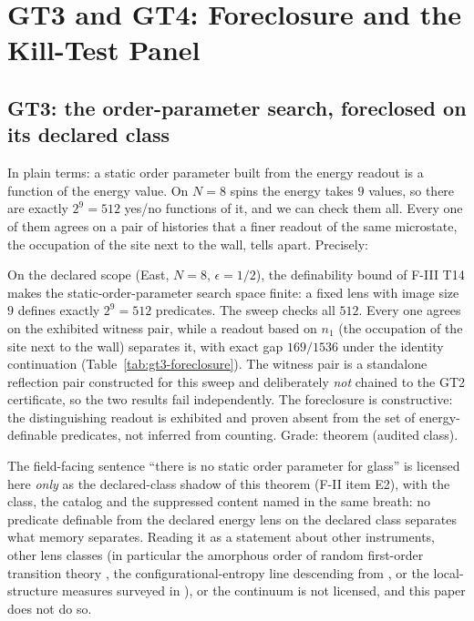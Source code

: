\section{GT3 and GT4: Foreclosure and the Kill-Test Panel}
\label{sec:gt3-gt4}

\subsection{GT3: the order-parameter search, foreclosed on its declared class}

In plain terms: a static order parameter built from the energy readout is a function of the energy
value. On $N=8$ spins the energy takes $9$ values, so there are exactly $2^9 = 512$ yes/no
functions of it, and we can check them all. Every one of them agrees on a pair of histories that a
finer readout of the same microstate, the occupation of the site next to the wall, tells apart.
Precisely:

On the declared scope (East, $N=8$, $\epsilon = 1/2$), the definability bound of F-III T14 makes
the static-order-parameter search space finite: a fixed lens with image size $9$ defines exactly
$2^9 = 512$ predicates. The sweep checks all $512$. Every one agrees on the exhibited witness
pair, while a readout based on $n_1$ (the occupation of the site next to the wall) separates it,
with exact gap $169/1536$ under the identity continuation (Table~\ref{tab:gt3-foreclosure}). The
witness pair is a standalone reflection pair constructed for this sweep and deliberately
\emph{not} chained to the GT2 certificate, so the two results fail independently. The foreclosure
is constructive: the distinguishing readout is exhibited and proven absent from the set of
energy-definable predicates, not inferred from counting. Grade: theorem (audited class).



The field-facing sentence ``there is no static order parameter for glass'' is licensed here
\emph{only} as the declared-class shadow of this theorem (F-II item E2), with the class, the
catalog and the suppressed content named in the same breath: no predicate definable from the
declared energy lens on the declared class separates what memory separates. Reading it as a
statement about other instruments, other lens classes (in particular the amorphous order of
random first-order transition theory \cite{kirkpatrick-thirumalai-wolynes-1989,lubchenko-wolynes-2007},
the configurational-entropy line descending from \cite{adam-gibbs-1965}, or the local-structure
measures surveyed in \cite{royall-williams-2015}), or the continuum is not licensed, and this
paper does not do so.

